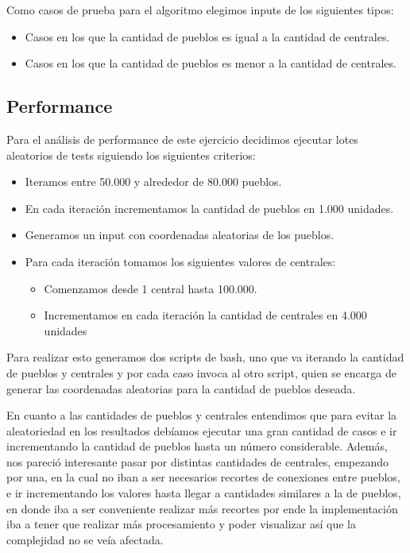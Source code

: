Como casos de prueba para el algoritmo elegimos inputs de los siguientes tipos:
\begin{itemize}
\item Casos en los que la cantidad de pueblos es igual a la cantidad de centrales.
\item Casos en los que la cantidad de pueblos es menor a la cantidad de centrales.
\end{itemize}

\subsection{Performance}

Para el an\'alisis de performance de este ejercicio decidimos ejecutar lotes aleatorios de tests siguiendo los siguientes criterios:

\begin{itemize}
	\item Iteramos entre 50.000 y alrededor de 80.000 pueblos.
	\item En cada iteraci\'on incrementamos la cantidad de pueblos en 1.000 unidades.
	\item Generamos un input con coordenadas aleatorias de los pueblos.
	\item Para cada iteraci\'on tomamos los siguientes valores de centrales:
	\begin{itemize}
		\item Comenzamos desde 1 central hasta 100.000.
		\item Incrementamos en cada iteraci\'on la cantidad de centrales en 4.000 unidades
	\end{itemize}
\end{itemize}

Para realizar esto generamos dos scripts de bash, uno que va iterando la cantidad de pueblos y centrales y por cada caso invoca al otro script, quien se encarga de generar las coordenadas aleatorias para la cantidad de pueblos deseada.

En cuanto a las cantidades de pueblos y centrales entendimos que para evitar la aleatoriedad en los resultados deb\'iamos ejecutar una gran cantidad de casos e ir incrementando la cantidad de pueblos hasta un n\'umero considerable. 
Adem\'as, nos pareci\'o interesante pasar por distintas cantidades de centrales, empezando por una, en la cual no iban a ser necesarios recortes de conexiones entre pueblos, e ir incrementando los valores hasta llegar a cantidades similares a la de pueblos, en donde iba a ser conveniente realizar m\'as recortes por ende la implementaci\'on iba a tener que realizar m\'as procesamiento y poder visualizar as\'i que la complejidad no se ve\'ia afectada.

